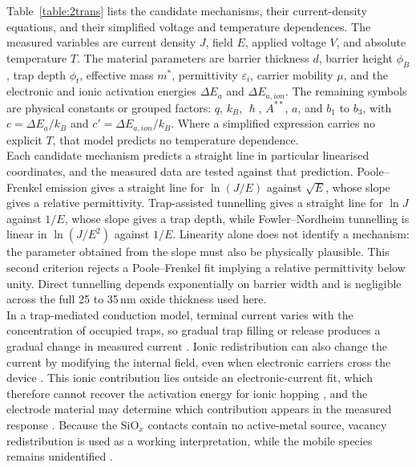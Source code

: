 \noindent Table~\ref{table:2trans} lists the candidate mechanisms, their current-density equations, and their
simplified voltage and temperature dependences. The measured variables are current density $J$, field $E$, applied
voltage $V$, and absolute temperature $T$. The material parameters are barrier thickness $d$, barrier height
$\phi_B$, trap depth $\phi_t$, effective mass $m^*$, permittivity $\varepsilon_i$, carrier mobility $\mu$, and the
electronic and ionic activation energies $\Delta E_a$ and $\Delta E_{a,ion}$. The remaining symbols are physical
constants or grouped factors: $q$, $k_B$, $\hslash$, $A^{**}$, $a$, and $b_1$ to $b_3$, with
$c=\Delta E_a/k_B$ and $c'=\Delta E_{a,ion}/k_B$. Where a simplified expression carries no explicit $T$, that model
predicts no temperature dependence.\\

\noindent Each candidate mechanism predicts a straight line in particular linearised coordinates, and the measured
data are tested against that prediction. Poole--Frenkel emission gives a straight line for $\ln(J/E)$ against
$\sqrt{E}$, whose slope gives a relative permittivity. Trap-assisted tunnelling gives a straight line for $\ln J$
against $1/E$, whose slope gives a trap depth, while Fowler--Nordheim tunnelling is linear in $\ln(J/E^2)$ against
$1/E$. Linearity alone does not identify a mechanism: the parameter obtained from the slope must also be physically
plausible. This second criterion rejects a Poole--Frenkel fit implying a relative permittivity below unity. Direct
tunnelling depends exponentially on barrier width and is negligible across the full 25 to 35\,nm oxide thickness
used here.\\

\noindent In a trap-mediated conduction model, terminal current varies with the concentration of occupied traps, so
gradual trap filling or release produces a gradual change in measured current
\cite{many1962theory, houng1999current}. Ionic redistribution can also change the current by modifying the internal
field, even when electronic carriers cross the device \cite{waser2009redox, meyer2005oxygen}. This ionic contribution
lies outside an electronic-current fit, which therefore cannot recover the activation energy for ionic hopping
\cite{bucci1966ionic}, and the electrode material may determine which contribution appears in the measured response
\cite{ge2014electrode}. Because the SiO$_x$ contacts contain no active-metal source, vacancy redistribution is used
as a working interpretation, while the mobile species remains unidentified
\cite{mehonic2015structural, kenyon2019interplay}.

